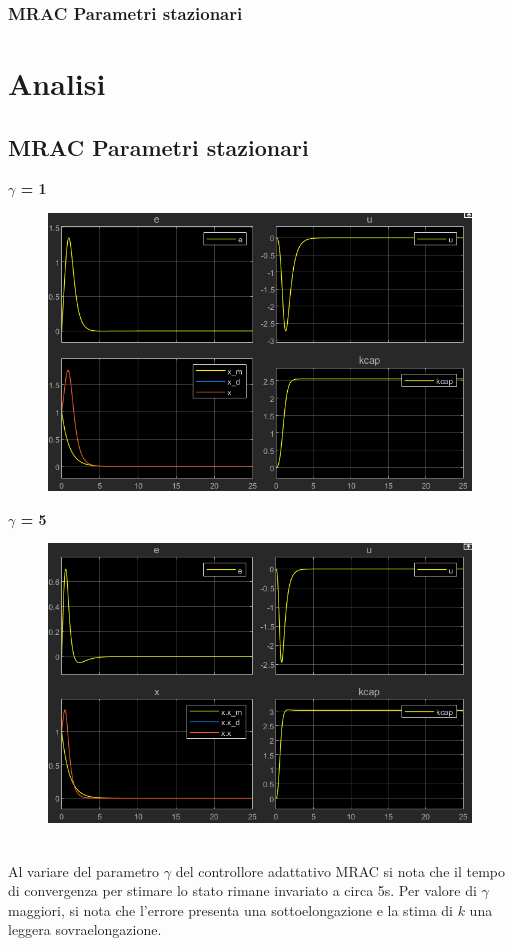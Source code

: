 \documentclass{beamer}
\begin{document}
\begin{frame}
	\frametitle{MRAC Parametri stazionari}
	\section{Analisi}
	\subsection{MRAC Parametri stazionari}
	\begin{minipage}[t]{0.45\textwidth}
		\textbf{\(\gamma \) = 1}
		\begin{figure}
			\includegraphics[scale=0.25]{2022-05-20-10-29-19.png} %
		\end{figure}
	\end{minipage}
	\begin{minipage}[t]{0.45\textwidth}
		\textbf{\(\gamma \) = 5}
		\begin{figure}
			\includegraphics[scale=0.25]{2022-05-20-10-33-35.png} %
		\end{figure}
	\end{minipage}
	\vspace{0.1cm}
	\\Al variare del parametro \(\gamma \) del controllore adattativo MRAC si nota che il tempo di convergenza per stimare lo stato rimane invariato a circa 5s. Per valore di \(\gamma \) maggiori, si nota che l'errore presenta una sottoelongazione e la stima di \(k\) una leggera sovraelongazione.
\end{frame}
\end{document}
